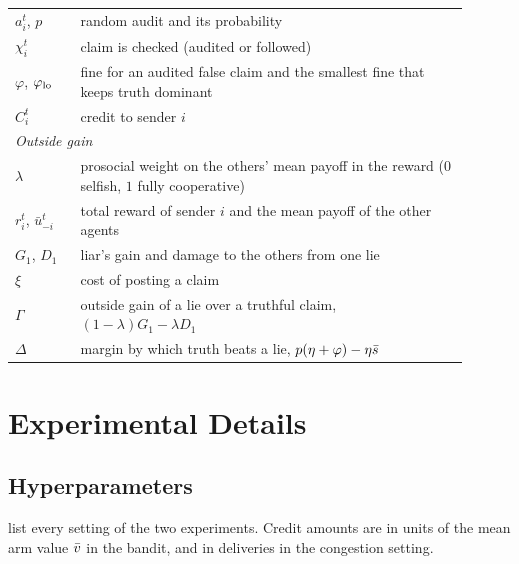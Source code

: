 \begin{table}[t]
\begin{tabular}{p{0.13\linewidth}p{0.77\linewidth}}
    $a_i^t$, $p$ & random audit and its probability \\
    $\chi_i^t$ & claim is checked (audited or followed) \\
    $\varphi$, $\varphi_{\mathrm{lo}}$ & fine for an audited false claim and the smallest fine that keeps truth dominant \\
    $C_i^t$ & \tvc{} credit to sender $i$ \\
    \midrule
    \multicolumn{2}{l}{\emph{Outside gain}} \\
    $\lambda$ & prosocial weight on the others' mean payoff in the reward ($0$ selfish, $1$ fully cooperative) \\
    $r_i^t$, $\bar u_{-i}^t$ & total reward of sender $i$ and the mean payoff of the other agents \\
    $G_1$, $D_1$ & liar's gain and damage to the others from one lie \\
    $\xi$ & cost of posting a claim \\
    $\Gamma$ & outside gain of a lie over a truthful claim, $(1-\lambda)G_1-\lambda D_1$ \\
    $\Delta$ & margin by which truth beats a lie, $p(\eta+\varphi)-\eta\bar s$ \\
    \bottomrule
  \end{tabular}
\end{table}

\section{Experimental Details}
\label{app:details}

\subsection{Hyperparameters}

 list every setting of the two experiments. Credit amounts are in units of the mean arm value $\bar v$ in the bandit, and in deliveries in the congestion setting.

